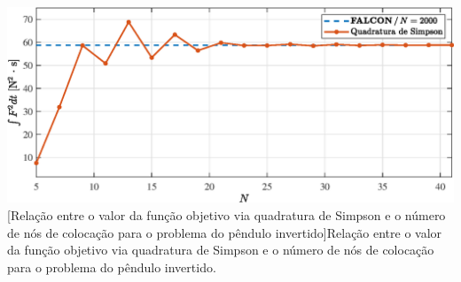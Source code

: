 \noindent	
\begin{minipage}{\textwidth}
	\vspace{\onelineskip}
	\centering
	\includegraphics[scale=0.7]{fig/resultados/penduloInvertido/obs/hersim/NvsJ}
	[Relação entre o valor da função objetivo via quadratura de Simpson e o número de nós de colocação para o problema do pêndulo invertido]{Relação entre o valor da função objetivo via quadratura de Simpson e o número de nós de colocação para o problema do pêndulo invertido.}
	\label{fig:penduloInvertido:hersim:NvsJ}
	\vspace{\onelineskip}
\end{minipage}
